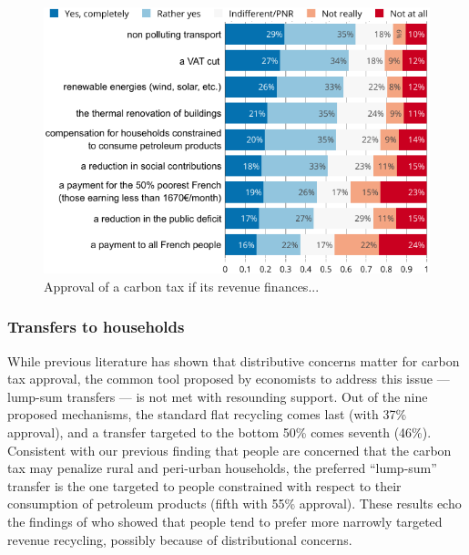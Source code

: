\documentclass[english,5p,authoryear]{elsarticle}
\begin{document}

\begin{figure}[!htbp]
\centering
\includegraphics[width=\columnwidth]{Images/tax_condition_valc.png}
\caption{Approval of a carbon tax if its revenue finances...}
\label{fig:recycling}
\end{figure}

        \subsubsection{Transfers to households}
While previous literature has shown that distributive concerns matter for carbon tax approval, the common tool proposed by economists to address this issue --- lump-sum transfers --- is not met with resounding support. Out of the nine proposed mechanisms, the standard flat recycling comes last (with 37\% approval), and a transfer targeted to the bottom 50\% comes seventh (46\%). Consistent with our previous finding that people are concerned that the carbon tax may penalize rural and peri-urban households, the preferred ``lump-sum'' transfer is the one targeted to people constrained with respect to their consumption of petroleum products (fifth with 55\% approval). These results echo the findings of \citet{kallbekken_et_al_2011} who showed that people tend to prefer more narrowly targeted revenue recycling, possibly because of distributional concerns. %
\end{document}
